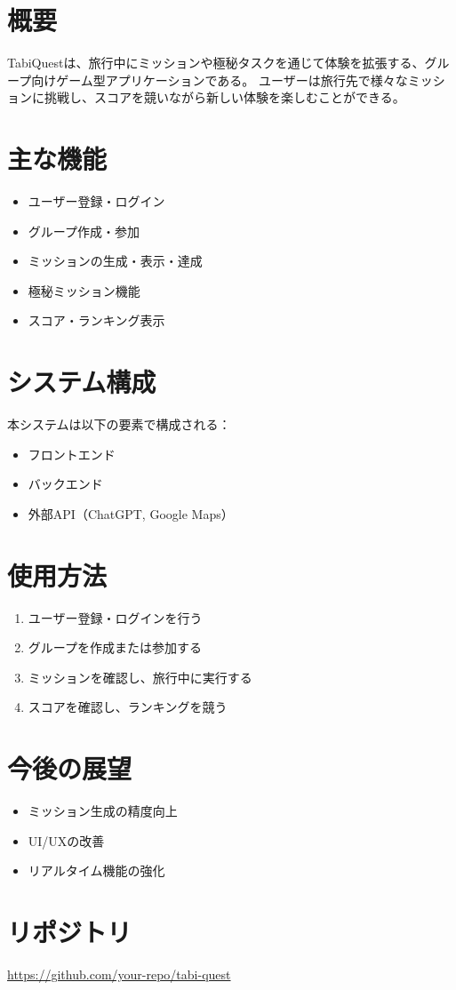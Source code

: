 \section{概要}
TabiQuestは、旅行中にミッションや極秘タスクを通じて体験を拡張する、グループ向けゲーム型アプリケーションである。  
ユーザーは旅行先で様々なミッションに挑戦し、スコアを競いながら新しい体験を楽しむことができる。

\section{主な機能}
\begin{itemize}
    \item ユーザー登録・ログイン
    \item グループ作成・参加
    \item ミッションの生成・表示・達成
    \item 極秘ミッション機能
    \item スコア・ランキング表示
\end{itemize}

\section{システム構成}
本システムは以下の要素で構成される：
\begin{itemize}
    \item フロントエンド
    \item バックエンド
    \item 外部API（ChatGPT, Google Maps）
\end{itemize}

\section{使用方法}
\begin{enumerate}
    \item ユーザー登録・ログインを行う
    \item グループを作成または参加する
    \item ミッションを確認し、旅行中に実行する
    \item スコアを確認し、ランキングを競う
\end{enumerate}

\section{今後の展望}
\begin{itemize}
    \item ミッション生成の精度向上
    \item UI/UXの改善
    \item リアルタイム機能の強化
\end{itemize}

\section{リポジトリ}
\url{https://github.com/your-repo/tabi-quest}